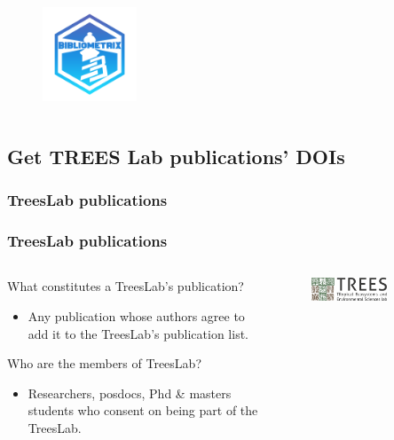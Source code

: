 \documentclass[aspectratio=169]{beamer}
\begin{document}
\begin{frame}
\begin{columns}
\begin{column}{0.5\textwidth}
\begin{figure}
				\includegraphics[width=0.25\textwidth]{logos/bibliometrix.png}
			\end{figure}
		\end{column}
	\end{columns}
\end{frame}


\subsection{Get TREES Lab publications' DOIs}


\subsubsection{TreesLab publications}

\begin{frame}
	\frametitle{TreesLab publications}
	\begin{columns}
		\begin{column}{0.5\textwidth}
            What constitutes a TreesLab's publication?
			\begin{itemize}
                \item Any publication whose authors agree to add it to the  
                    TreesLab's publication list.
			\end{itemize}
            \vspace{\baselineskip}
            Who are the members of TreesLab?
			\begin{itemize}
                \item Researchers, pos\-docs, Phd \& masters students who 
                    consent on being part of the TreesLab. 
			\end{itemize}
		\end{column}
		\begin{column}{0.5\textwidth}
			\begin{figure}
				\centering
				\includegraphics[width=0.7\textwidth]{logos/trees-color-h_2.png}
			\end{figure}
		\end{column}
	\end{columns}
\end{frame}
\end{document}

